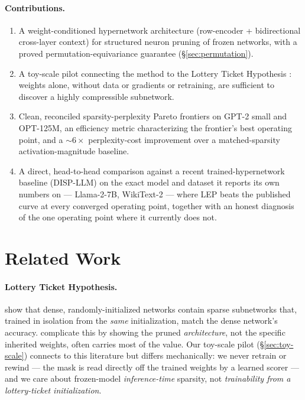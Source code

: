 \documentclass[11pt]{article}
\begin{document}
\paragraph{Contributions.}
\begin{enumerate}[topsep=2pt,itemsep=2pt]
  \item A weight-conditioned hypernetwork architecture (row-encoder + bidirectional
    cross-layer context) for structured neuron pruning of frozen networks,
    with a proved permutation-equivariance guarantee (\S\ref{sec:permutation}).
  \item A toy-scale pilot connecting the method to the Lottery Ticket Hypothesis
    \citep{frankle2019lottery}: weights alone, without data or gradients or
    retraining, are sufficient to discover a highly compressible subnetwork.
  \item Clean, reconciled sparsity-perplexity Pareto frontiers on GPT-2 small and
    OPT-125M, an efficiency metric characterizing the frontier's best
    operating point, and a $\sim\!6\times$ perplexity-cost improvement over a
    matched-sparsity activation-magnitude baseline.
  \item A direct, head-to-head comparison against a recent trained-hypernetwork
    baseline (DISP-LLM) on the exact model and dataset it reports its own
    numbers on --- Llama-2-7B, WikiText-2 --- where LEP beats the published curve
    at every converged operating point, together with an honest diagnosis of
    the one operating point where it currently does not.
\end{enumerate}

\section{Related Work}
\label{sec:related}

\paragraph{Lottery Ticket Hypothesis.} \citet{frankle2019lottery} show that dense,
randomly-initialized networks contain sparse subnetworks that, trained in
isolation from the \emph{same} initialization, match the dense network's accuracy.
\citet{liu2019rethinking} complicate this
by showing the pruned \emph{architecture}, not the specific inherited weights,
often carries most of the value. Our toy-scale pilot (\S\ref{sec:toy-scale}) connects to this
literature but differs mechanically: we never retrain or rewind --- the mask
is read directly off the trained weights by a learned scorer --- and we care
about frozen-model \emph{inference-time} sparsity, not \emph{trainability from a
lottery-ticket initialization}.
\end{document}
